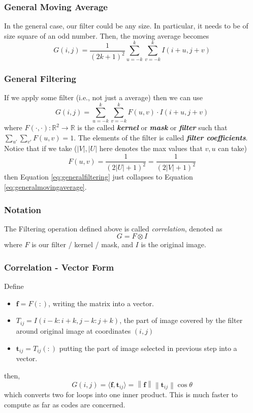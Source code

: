 \documentclass[11pt]{article}
\renewcommand{\bf}{\mathbf{f}}
\newcommand{\bt}{\mathbf{t}}
\newcommand{\real}{\mathbb{R}}
\newcommand{\norm}[1]{\left\lVert#1\right\rVert}
\begin{document}
\subsubsection{General Moving Average}
In the general case, our filter could be any size. In particular, it needs to be of size square of an odd number. Then, the moving average becomes
\begin{equation}
	G(i, j)=\frac{1}{(2 k+1)^{2}} \sum_{u=-k}^{k} \sum_{v=-k}^{k} I(i+u, j+v)\label{eq:generalmovingaverage}
\end{equation}
\subsubsection{General Filtering}
If we apply some filter (i.e., not just a average) then we can use
\begin{equation}
	G(i, j)=\sum_{u=-k}^{k} \sum_{v=-k}^{k} F(u, v) \cdot I(i+u, j+v)\label{eq:generalfiltering}
\end{equation}
where $F(\cdot, \cdot): \real^2 \rightarrow \real$ is the called \textit{\textbf{kernel}} or \textit{\textbf{mask}} or \textit{\textbf{filter}} such that $\sum_{u'}\sum_{v'}F(u, v) = 1$. The elements of the filter is called \textit{\textbf{filter coefficients}}. Notice that if we take ($|V|, |U|$ here denotes the max values that $v, u$ can take)
\begin{equation}
	F(u, v) = \frac{1}{(2|U| + 1)^{2}} = \frac{1}{(2|V| + 1)^{2}}
\end{equation}
then Equation \ref{eq:generalfiltering} just collapses to Equation \ref{eq:generalmovingaverage}.
\subsubsection{Notation}
The Filtering operation defined above is called \textit{correlation}, denoted as
\begin{equation}
	G = F\otimes I
\end{equation}
where $F$ is our filter / kernel / mask, and $I$ is the original image. 

\subsubsection{Correlation - Vector Form}
Define 
\begin{itemize}
	\item $\bf = F(:)$, writing the matrix into a vector.
	\item $T_{i j}=I(i-k: i+k, j-k: j+k)$, the part of image covered by the filter around original image at coordinates $(i, j)$
	\item $\mathbf{t}_{i j}=T_{i j}(:)$ putting the part of image selected in previous step into a vector. 
\end{itemize}
then, 
\begin{equation}
	G(i, j)= \langle \mathbf{f}, \mathbf{t}_{i j}\rangle = \norm{\bf}\norm{\bt_{ij}}\cos \theta
\end{equation}
which converts two for loops into one inner product. This is much faster to compute as far as codes are concerned. 
\end{document}
